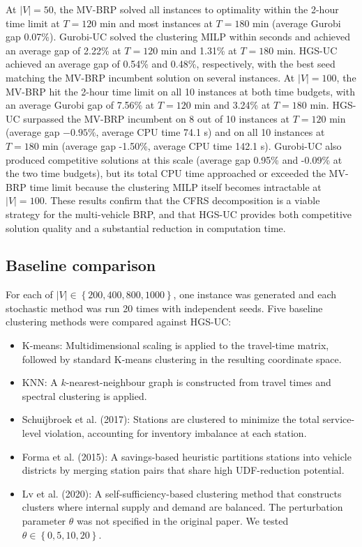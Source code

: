 \documentclass[11pt]{article}
\numberwithin{table}{section}
\numberwithin{figure}{section}
\begin{document}
At $\mid V\mid =50$, the MV-BRP solved all instances to optimality within the 2-hour time limit at $T=120$ min and most instances at $T=180$ min (average Gurobi gap 0.07\%). Gurobi-UC solved the clustering MILP within seconds and achieved an average gap of 2.22\% at $T=120$ min and 1.31\% at $T=180$ min. HGS-UC achieved an average gap of 0.54\% and 0.48\%, respectively, with the best seed matching the MV-BRP incumbent solution on several instances. At $\mid V\mid =100$, the MV-BRP hit the 2-hour time limit on all 10 instances at both time budgets, with an average Gurobi gap of 7.56\% at $T=120$ min and 3.24\% at $T=180$ min. HGS-UC surpassed the MV-BRP incumbent on 8 out of 10 instances at $T=120$ min (average gap $-0.95\%$, average CPU time 74.1 s) and on all 10 instances at $T=180$ min (average gap -1.50\%, average CPU time 142.1 s). Gurobi-UC also produced competitive solutions at this scale (average gap 0.95\% and -0.09\% at the two time budgets), but its total CPU time approached or exceeded the MV-BRP time limit because the clustering MILP itself becomes intractable at $\mid V\mid =100$. These results confirm that the CFRS decomposition is a viable strategy for the multi-vehicle BRP, and that HGS-UC provides both competitive solution quality and a substantial reduction in computation time.

\subsection{Baseline comparison}

For each of $\mid V\mid \in \left\{ 200,400,800,1000 \right\}$, one instance was generated and each stochastic method was run 20 times with independent seeds. Five baseline clustering methods were compared against HGS-UC:

\begin{itemize}
\item K-means: Multidimensional scaling is applied to the travel-time matrix, followed by standard K-means clustering in the resulting coordinate space.
\item KNN: A $k$-nearest-neighbour graph is constructed from travel times and spectral clustering is applied.
\item Schuijbroek et al. (2017): Stations are clustered to minimize the total service-level violation, accounting for inventory imbalance at each station.
\item Forma et al. (2015): A savings-based heuristic partitions stations into vehicle districts by merging station pairs that share high UDF-reduction potential.
\item Lv et al. (2020): A self-sufficiency-based clustering method that constructs clusters where internal supply and demand are balanced. The perturbation parameter $\theta $ was not specified in the original paper. We tested $\theta \in \left\{ 0,5,10,20 \right\}$.
\end{itemize}
\end{document}
